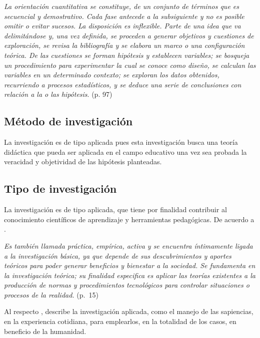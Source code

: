\documentclass[12pt,a4paper]{article}
\begin{document}
\begin{displayquote}
	\emph{La orientación cuantitativa se constituye, de un conjunto de términos que es secuencial y demostrativo. Cada fase antecede a la subsiguiente y no es posible omitir o evitar sucesos. La disposición es inflexible. Parte de una idea que va delimitándose y, una vez definida, se proceden a generar objetivos y cuestiones de exploración, se revisa la bibliografía y se elabora un marco o una configuración teórica. De las cuestiones se forman hipótesis y establecen variables; se bosqueja un procedimiento para experimentar la cual se conoce como diseño, se calculan las variables en un determinado contexto; se exploran los datos obtenidos, recurriendo a procesos estadísticos, y se deduce una serie de conclusiones con relación a la o las hipótesis}. (p. 97)
\end{displayquote}

\subsection{Método de investigación}

La investigación es de tipo aplicada pues esta investigación busca una teoría didáctica que pueda ser aplicada en el campo educativo una vez sea probada la veracidad y objetividad de las hipótesis planteadas.

\subsection{Tipo de investigación}
La investigación es de tipo aplicada, que tiene por finalidad contribuir al conocimiento científicos de aprendizaje y herramientas pedagógicas. De acuerdo a \cite{alzina_metodologiinvestigacion_2004}.%

\begin{displayquote}
	\emph{Es también llamada práctica, empírica, activa y se encuentra íntimamente ligada a la investigación básica, ya que depende de sus descubrimientos y aportes teóricos para poder generar beneficios y bienestar a la sociedad. Se fundamenta en la investigación teórica; su finalidad especifica es aplicar las teorías existentes a la producción de normas y procedimientos tecnológicos para controlar situaciones  o procesos de la realidad.} (p.~15)
\end{displayquote}

Al respecto \cite{kothari_research_2004}, describe la investigación aplicada, como el manejo de las sapiencias, en la experiencia cotidiana, para emplearlos, en la totalidad de los casos, en beneficio de la humanidad.
\end{document}
